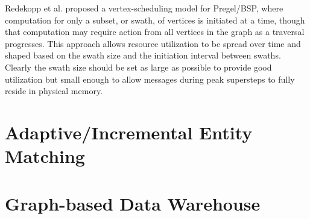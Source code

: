 Redekopp et al. proposed a vertex-scheduling model for Pregel/BSP, where computation for only a subset, or swath, of vertices is initiated at a time, though that computation may require action from all vertices in the graph as a traversal progresses. This approach allows resource utilization to be spread over time and shaped based on the swath size and the initiation interval between swaths. Clearly the swath size should be set as large as possible to provide good
utilization but small enough to allow messages during peak supersteps to fully reside in physical memory.
\section{Adaptive/Incremental Entity Matching}
\section{Graph-based Data Warehouse} 